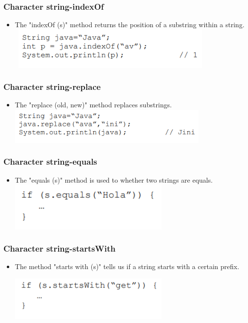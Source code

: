\documentclass[11pt]{beamer}
\begin{document}
\begin{frame}
\frametitle{Character string-indexOf}
\begin{itemize}
\item The "indexOf (s)" method returns the position of a substring within a string.
\
{\includegraphics[width=10.0cm]{img/a3.png}}
\end{itemize}
\end{frame}

\begin{frame}
\frametitle{Character string-replace}
\begin{itemize}
\item The "replace (old, new)" method replaces substrings.
\
{\includegraphics[width=10.0cm]{img/a4.png}}
\end{itemize}
\end{frame}

\begin{frame}
\frametitle{Character string-equals}
\begin{itemize}
\item The "equals (s)" method is used to  whether two strings are equals.
\
{\includegraphics[width=8.0cm]{img/a5.png}}
\end{itemize}
\end{frame}

\begin{frame}
\frametitle{Character string-startsWith}
\begin{itemize}
\item The method "starts with (s)" tells us if a string starts with a certain prefix.
\

{\includegraphics[width=8.0cm]{img/a6.png}}
\end{itemize}
\end{frame}
\end{document}
